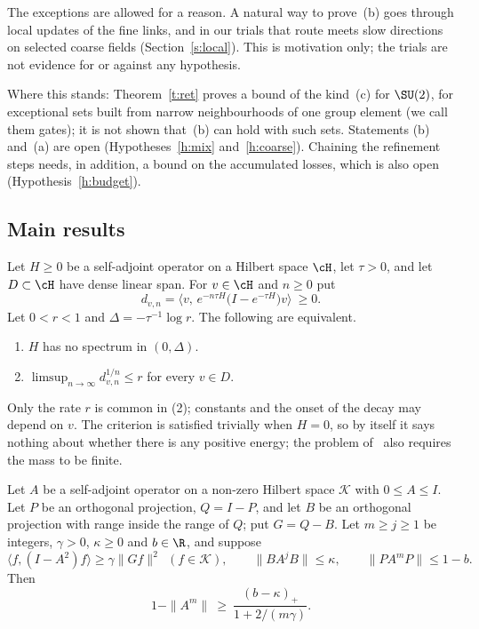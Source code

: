 The exceptions are allowed for a reason. A natural way to prove~(b) goes through local updates of the fine
links, and in our trials that route meets slow directions on selected coarse fields (Section~\ref{s:local}).
This is motivation only; the trials are not evidence for or against any hypothesis.

Where this stands: Theorem~\ref{t:ret} proves a bound of the kind~(c) for $\SU(2)$, for exceptional sets
built from narrow neighbourhoods of one group element (we call them gates); it is not shown that~(b) can
hold with such sets. Statements (b) and~(a)
are open (Hypotheses~\ref{h:mix} and~\ref{h:coarse}). Chaining the refinement steps needs, in addition, a
bound on the accumulated losses, which is also open (Hypothesis~\ref{h:budget}).

\subsection{Main results}
\begin{theorem}\label{t:crit}
Let $H\ge0$ be a self-adjoint operator on a Hilbert space $\cH$, let $\tau>0$, and let $D\subset\cH$ have dense
linear span. For $v\in\cH$ and $n\ge0$ put
\[
d_{v,n}=\big\langle v,\,e^{-n\tau H}\big(I-e^{-\tau H}\big)v\big\rangle\ \ge0 .
\]
Let $0<r<1$ and $\Delta=-\tau^{-1}\log r$. The following are equivalent.
\begin{enumerate}
\item $H$ has no spectrum in $(0,\Delta)$.
\item $\limsup_{n\to\infty}d_{v,n}^{1/n}\le r$ for every $v\in D$.
\end{enumerate}
\end{theorem}

Only the rate $r$ is common in (2); constants and the onset of the decay may depend on $v$. The criterion is
satisfied trivially when $H=0$, so by itself it says nothing about whether there is any positive energy; the
problem of~\cite{JW} also requires the mass to be finite.

\begin{theorem}\label{t:inh}
Let $A$ be a self-adjoint operator on a non-zero Hilbert space $\mathcal K$ with $0\le A\le I$. Let $P$ be an
orthogonal projection, $Q=I-P$, and let $B$ be an orthogonal projection with range inside the range of $Q$;
put $G=Q-B$. Let $m\ge j\ge1$ be integers, $\gamma>0$, $\kappa\ge0$ and $b\in\R$, and suppose
\begin{equation}\label{e:hyp}
\langle f,(I-A^{2})f\rangle\ge\gamma\|Gf\|^2\ \ (f\in\mathcal K),\qquad
\|BA^{j}B\|\le\kappa,\qquad \|PA^{m}P\|\le1-b .
\end{equation}
Then
\begin{equation}\label{e:inh}
1-\|A^m\|\ \ge\ \frac{(b-\kappa)_+}{1+2/(m\gamma)} .
\end{equation}
\end{theorem}

